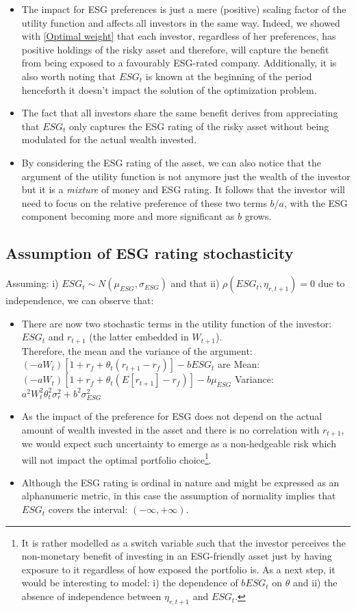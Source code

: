 \documentclass[12pt]{article}
\begin{document}
	\begin{itemize}
		\item The impact for ESG preferences is just a mere (positive) scaling factor of the utility function and affects all investors in the same way. Indeed, we showed with \ref{Optimal weight} that each investor, regardless of her preferences, has positive holdings of the risky asset and therefore, will capture the benefit from being exposed to a favourably ESG-rated company. Additionally, it is also worth noting that $ESG_t$ is known at the beginning of the period  henceforth it doesn't impact the solution of the optimization problem.   
		\item The fact that all investors share the same benefit derives from appreciating that $ESG_t$ only captures the ESG rating of the risky asset without being modulated for the actual wealth invested.
		\item By considering the ESG rating of the asset, we can also notice that the argument of the utility function is not anymore just the wealth of the investor but it is a \textit{mixture} of money and ESG rating. It follows that the investor will need to focus on the relative preference of these two terms $b/a$, with the ESG component becoming more and more significant as $b$ grows. \vspace{-1em} 
	\end{itemize}
	
	\subsection{Assumption of ESG rating stochasticity}
	Assuming: i) $ESG_t \sim N(\mu_{ESG},\sigma_{ESG})$ and that ii) $\rho(ESG_t,\eta_{r, t+1}) = 0 $ due to independence, we can observe that:
	\begin{itemize}
		\item There are now two stochastic terms in the utility function of the investor: $ESG_t$ and $r_{t+1}$ (the latter embedded in $W_{t+1}$).\\ Therefore, the mean and the variance of the argument: $(-aW_t) [1 + r_f + \theta_t(r_{t+1}-r_f)] - bESG_t$ are
		\subitem Mean: $(-aW_t) [1 + r_f + \theta_t(E[r_{t+1}]-r_f)] - b\mu_{ESG}$
		\subitem Variance: $a^2W_t^2\theta_t^2\sigma_r^2 + b^2\sigma_{ESG}^2$
		\item As the impact of the preference for ESG does not depend on the actual amount of wealth invested in the asset and there is no correlation with $r_{t+1}$, we would expect such uncertainty to emerge as a non-hedgeable risk which will not impact the optimal portfolio choice\footnote {It is rather modelled as a switch variable such that the investor perceives the non-monetary benefit of investing in an ESG-friendly asset just by having exposure to it regardless of how exposed the portfolio is. As a next step, it would be interesting to model: i) the dependence of $bESG_t$ on $\theta$ and ii) the absence of independence between $\eta_{r, t+1}$ and $ESG_t$.}.
		\item Although the ESG rating is ordinal in nature and might be expressed as an alphanumeric metric, in this case the assumption of normality implies that $ESG_t$ covers the interval: $(-\infty,+\infty )$.
	\end{itemize}
\end{document}
